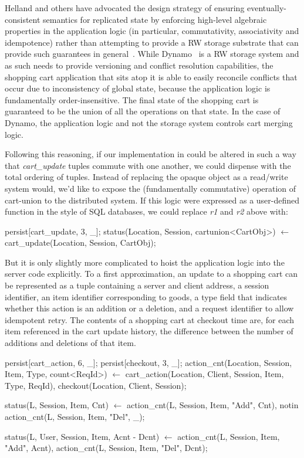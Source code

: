 Helland and others have advocated the design strategy of ensuring eventually-consistent 
semantics for replicated state by enforcing high-level algebraic 
properties in the application logic (in particular, commutativity, associativity and 
idempotence) rather than attempting to provide a RW storage substrate that can provide
such guarantees in general~\cite{quicksand, beyond}.  While Dynamo~\cite{dynamo} 
is a RW storage system
and as such needs to provide versioning and conflict resolution capabilities, the shopping
cart application that sits atop it is able to easily reconcile conflicts that occur due to inconsistency of global state, because the application logic is fundamentally order-insensitive.
The final state of the shopping cart is guaranteed to be the union of all the operations on
that state.  In the case of Dynamo, the application logic and not the storage system controls
cart merging logic.

Following this reasoning, if our implementation in \lang could be altered in such a way that
{\em cart\_update} tuples commute with one another,  we could dispense with the total
ordering of tuples.  Instead of replacing the opaque object as a read/write system would,
we'd like to expose the (fundamentally commutative) operation of cart-union to the distributed
system.  If this logic were expressed as a user-defined function in the style of SQL databases,
we could replace {\em r1} and {\em r2} above with:

\begin{Dedalus}
persist[cart_update, 3, _];
status(Location, Session, cartunion<CartObj>) \(\leftarrow\)
    cart_update(Location, Session, CartObj);
\end{Dedalus}

But it is only slightly more complicated to hoist the application logic into
the server code explicitly.  To a first approximation, an update to a shopping cart
can be represented as a tuple containing a server and client address, a session identifier,
an item identifier corresponding to goods, a type field that indicates whether this action
is an addition or a deletion, and a request identifier to allow idempotent retry.  The contents
of a shopping cart at checkout time are, for each item referenced in the cart update history, 
the difference between the number of additions and deletions of that item.

\begin{Dedalus}
persist[cart_action, 6, _];
persist[checkout, 3, _];
action_cnt(Location, Session, Item, Type, count<ReqId>) \(\leftarrow\)
    cart_action(Location, Client, Session, Item, Type, ReqId),
    checkout(Location, Client, Session);

status(L, Session, Item, Cnt) \(\leftarrow\)
    action_cnt(L, Session, Item, "Add", Cnt),
    notin action_cnt(L, Session, Item, "Del", _);

status(L, User, Session, Item, Acnt - Dcnt) \(\leftarrow\)
    action_cnt(L, Session, Item, "Add", Acnt),
    action_cnt(L, Session, Item, "Del", Dcnt);

\end{Dedalus}



